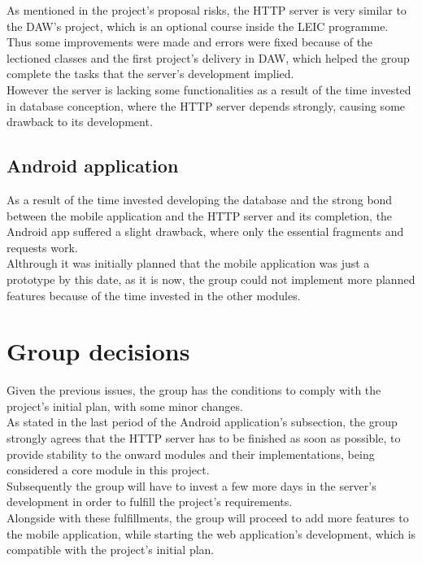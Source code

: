     As mentioned in the project's proposal risks, the HTTP server is very similar to the DAW's project, which is an optional
    course inside the LEIC programme. Thus some improvements were made and errors were fixed because of the lectioned classes 
    and the first project's delivery in DAW, which helped the group complete the tasks that the server's development implied.\\

    However the server is lacking some functionalities as a result of the time invested in database conception,
    where the HTTP server depends strongly, causing some drawback to its development.

    \subsection{Android application}

    As a result of the time invested developing the database and the strong bond between the mobile application and the HTTP server 
    and its completion, the Android app suffered a slight drawback, where only the essential fragments and requests work.\\

    Althrough it was initially planned that the mobile application was just a prototype by this date, as it is now, the group
    could not implement more planned features because of the time invested in the other modules.

    \section{Group decisions}

    Given the previous issues, the group has the conditions to comply with the project's initial plan, with some minor changes.\\
    
    As stated in the last period of the Android application's subsection, the group strongly agrees that the HTTP server has to be finished
    as soon as possible, to provide stability to the onward modules and their implementations, being considered a core module in this project.\\

    Subsequently the group will have to invest a few more days in the server's development in order to fulfill the project's requirements.\\

    Alongside with these fulfillments, the group will proceed to add more features to the mobile application, while starting the web application's development,
    which is compatible with the project's initial plan.